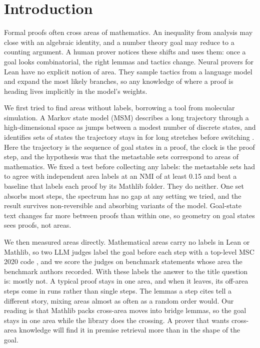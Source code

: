 \section{Introduction}
\label{sec:intro}

Formal proofs often cross areas of mathematics. An inequality from analysis
may close with an algebraic identity, and a number theory goal may reduce to
a counting argument. A human prover notices these shifts and uses them: once
a goal looks combinatorial, the right lemmas and tactics change. Neural
provers for Lean \citep{yang2023leandojo,xin2025deepseekproverv15} have no
explicit notion of area. They sample tactics from a language model and expand
the most likely branches, so any knowledge of where a proof is heading lives
implicitly in the model's weights.

We first tried to find areas without labels, borrowing a tool from molecular
simulation. A Markov state model (MSM) describes a long trajectory through a
high-dimensional space as jumps between a modest number of discrete states,
and identifies sets of states the trajectory stays in for long stretches
before switching \citep{prinz2011markov,husic2018markov}. Here the trajectory
is the sequence of goal states in a proof, the clock is the proof step, and
the hypothesis was that the metastable sets correspond to areas of
mathematics. We fixed a test before collecting any labels: the metastable
sets had to agree with independent area labels at an NMI of at least 0.15
and beat a baseline that labels each proof by its Mathlib folder. They do
neither. One set absorbs most steps, the spectrum has no gap at any setting
we tried, and the result survives non-reversible and absorbing variants of
the model. Goal-state text changes far more between proofs than within one,
so geometry on goal states sees proofs, not areas.

We then measured areas directly. Mathematical areas carry no labels in Lean
or Mathlib, so two LLM judges label the goal before each step with a
top-level MSC 2020 code \citep{msc2020}, and we score the judges on benchmark
statements whose area the benchmark authors recorded. With these labels the
answer to the title question is: mostly not. A typical proof stays in one
area, and when it leaves, its off-area steps come in runs rather than single
steps. The lemmas a step cites tell a different story, mixing areas almost as
often as a random order would. Our reading is that Mathlib packs cross-area
moves into bridge lemmas, so the goal stays in one area while the library
does the crossing. A prover that wants cross-area knowledge will find it in
premise retrieval more than in the shape of the goal.

